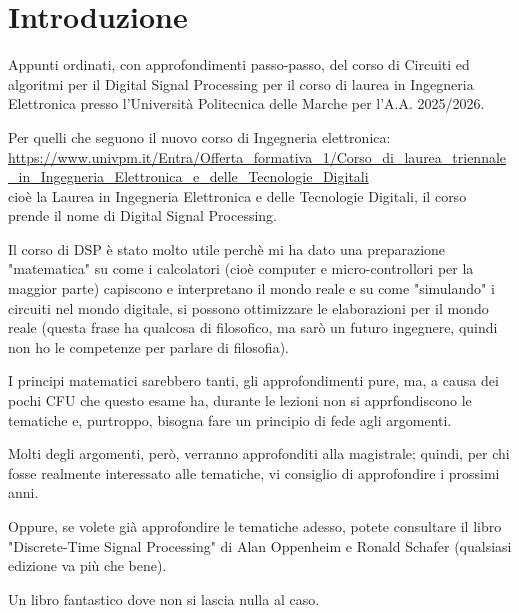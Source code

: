 \section*{Introduzione}

Appunti ordinati, con approfondimenti passo-passo, del corso di Circuiti ed algoritmi per il Digital Signal Processing per il corso di laurea in Ingegneria Elettronica 
presso l’Università Politecnica delle Marche per l'A.A. 2025/2026. \newline
        
Per quelli che seguono il nuovo corso di Ingegneria elettronica: \\
\url{https://www.univpm.it/Entra/Offerta_formativa_1/Corso_di_laurea_triennale_in_Ingegneria_Elettronica_e_delle_Tecnologie_Digitali} \\
cioè la Laurea in Ingegneria Elettronica e delle Tecnologie Digitali, 
il corso prende il nome di Digital Signal Processing. \newline 

Il corso di DSP è stato molto utile perchè mi ha dato una preparazione "matematica" su come i calcolatori (cioè computer e micro-controllori per la maggior parte) capiscono e interpretano il mondo reale e su come "simulando" i circuiti nel mondo digitale, 
si possono ottimizzare le elaborazioni per il mondo reale (questa frase ha qualcosa di filosofico, ma sarò un futuro ingegnere, quindi non ho le competenze per parlare di filosofia). \newline 

I principi matematici sarebbero tanti, gli approfondimenti pure, ma, a causa dei pochi CFU che questo esame ha, durante le lezioni non si apprfondiscono le tematiche e, purtroppo, bisogna fare un principio di fede agli argomenti. \newline 

Molti degli argomenti, però, verranno approfonditi alla magistrale; quindi, per chi fosse realmente interessato alle tematiche, vi consiglio di approfondire i prossimi anni. \newline 

Oppure, se volete già approfondire le tematiche adesso, potete consultare il libro "Discrete-Time Signal Processing" di Alan Oppenheim e Ronald Schafer (qualsiasi edizione va più che bene). \newline 

Un libro fantastico dove non si lascia nulla al caso. \newline 

